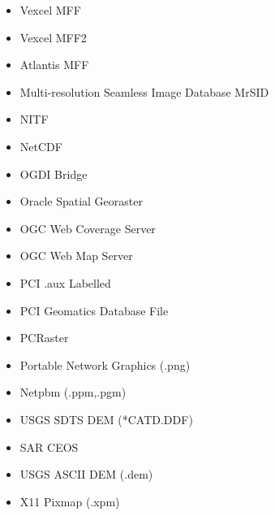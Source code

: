 \begin{itemize}
\item Vexcel MFF
\item Vexcel MFF2
\item Atlantis MFF
\item Multi-resolution Seamless Image Database  MrSID
\item NITF
\item NetCDF
\item OGDI Bridge
\item Oracle Spatial Georaster
\item OGC Web Coverage Server
\item OGC Web Map Server
\item PCI .aux Labelled
\item PCI Geomatics Database File
\item PCRaster 
\item Portable Network Graphics (.png)
\item Netpbm (.ppm,.pgm)
\item USGS SDTS DEM (*CATD.DDF)
\item SAR CEOS
\item USGS ASCII DEM (.dem)
\item X11 Pixmap (.xpm)

\end{itemize}
\clearpage

